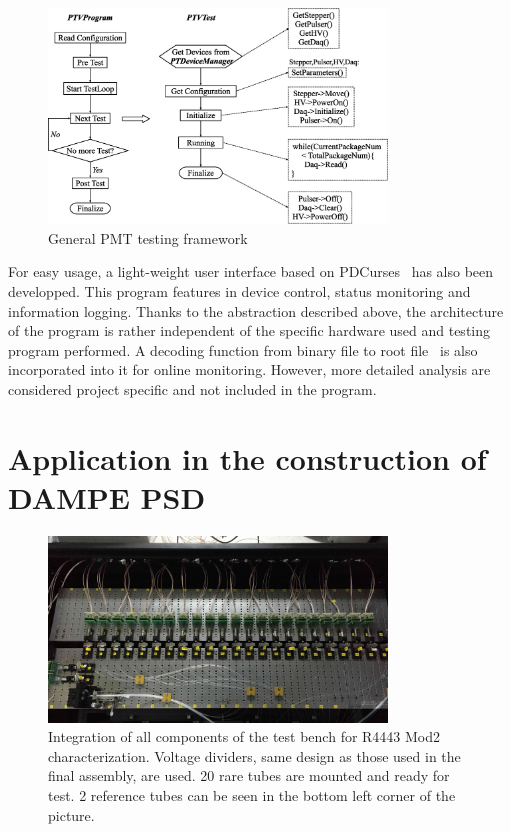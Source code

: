 \documentclass[5p, times]{elsarticle}
\begin{document}
\begin{figure}
  \centering
 \includegraphics[width=90mm]{software_framework}
\caption{General PMT testing framework}
\label{fig:software_framework}
\end{figure}

For easy usage, a light-weight user interface based on PDCurses~\cite{pdcurses} has also been developped.
This program features in device control, status monitoring and information logging.
Thanks to the abstraction described above, the architecture of the program is rather independent of the specific hardware used and testing program performed.
A decoding function from binary file to root file~\cite{root} is also incorporated into it for online monitoring.
However, more detailed analysis are considered project specific and not included in the program. 

\section{Application in the construction of DAMPE PSD}
\label{sec:application}

\begin{figure}
 \centering
 \includegraphics[width=90mm]{integration3}
\caption{Integration of all components of the test bench for R4443 Mod2 characterization.
Voltage dividers, same design as those used in the final assembly, are used. 
20 rare tubes are mounted and ready for test.
2 reference tubes can be seen in the bottom left corner of the picture. 
}
\label{fig:integrated_testbench}
\end{figure}
\end{document}
